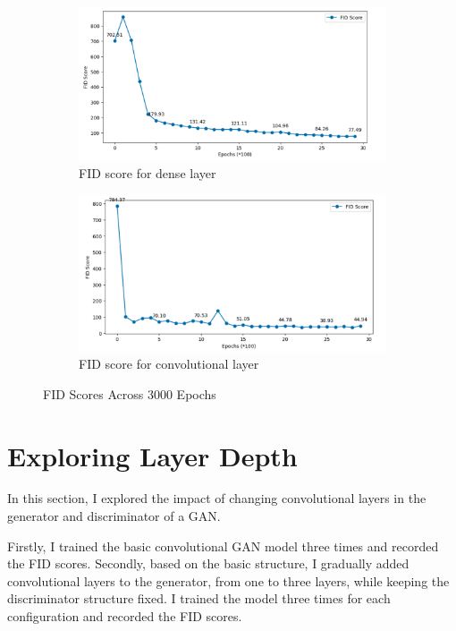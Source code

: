 \begin{figure}[H]
    \centering
    \begin{subfigure}[b]{\linewidth}
        \centering
        \includegraphics[width=0.7\linewidth]{./Images/fid_score_for_dense_layer.jpg}
        \caption{FID score for dense layer}
        \label{fig:Dense}
    \end{subfigure}
    \vspace{0.05\linewidth} 
    \begin{subfigure}[b]{\linewidth}
        \centering
        \includegraphics[width=0.7\linewidth]{./Images/fid_score_for_convolution_layer.jpg}
        \caption{FID score for convolutional layer}
        \label{fig:Conv2DTranspose}
    \end{subfigure}
    \caption{FID Scores Across 3000 Epochs}
    \label{fig:combined}
\end{figure}


\section{Exploring Layer Depth}

In this section, I explored the impact of changing convolutional layers in the generator and discriminator of a GAN.

Firstly, I trained the basic convolutional GAN model three times and recorded the FID scores. Secondly, based on the basic structure, I gradually added convolutional layers to the generator, from one to three layers, while keeping the discriminator structure fixed. I trained the model three times for each configuration and recorded the FID scores.

